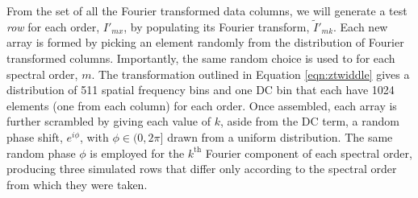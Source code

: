 		From the set of all the Fourier transformed data columns, we will generate a test \emph{row} for each order, $I'_{mx}$, by populating its Fourier transform, $\widetilde{I}'_{mk}$. 
		Each new array is formed by picking an element randomly from the distribution of Fourier transformed columns.
		Importantly, the same random choice is used to for each spectral order, $m$.
		The transformation outlined in Equation \ref{eqn:ztwiddle}
		gives a distribution of 511 spatial frequency bins and one DC bin that each have 1024 elements (one from each column) for each order. 
		Once assembled, each array is further scrambled by giving each value of $k$, aside from the DC term, a random phase shift, $e^{i\phi}$, with $\phi \in (0, 2\pi]$ drawn from a uniform distribution. 
		The same random phase $\phi$ is employed for the $k^{\text{th}}$ Fourier component of each spectral order, producing three simulated rows that differ only according to the spectral order from which they were taken. 
		
		
		
		
